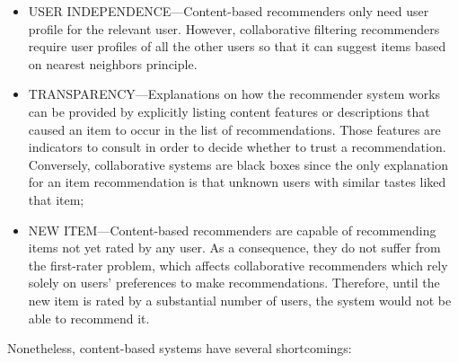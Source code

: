 \begin{itemize}
	\item USER INDEPENDENCE—Content-based recommenders only need user profile for the relevant user. However, collaborative filtering recommenders require user profiles of all the other users so that it can suggest items based on nearest neighbors principle.
	\item TRANSPARENCY—Explanations on how the recommender system works can be provided by explicitly listing content features or descriptions that caused an item to occur in the list of recommendations. Those features are indicators to consult in order to decide whether to trust a recommendation. Conversely, collaborative systems are black boxes since the only explanation for an item recommendation is that unknown users with similar tastes liked that item;
	\item NEW ITEM—Content-based recommenders are capable of recommending items not yet rated by any user. As a consequence, they do not suffer from the first-rater problem, which affects collaborative recommenders which rely solely on users’ preferences to make recommendations. Therefore, until the new item is rated by a substantial number of users, the system would not be able to recommend it.
\end{itemize}

Nonetheless, content-based systems have several shortcomings:

